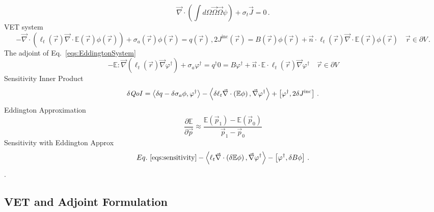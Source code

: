 \documentclass[review]{elsarticle}
\newcommand{\vr}{\vec{r}}
\newcommand{\vp}{\vec{p}}
\newcommand{\vO}{\vec{\Omega}}
\newcommand{\bra}{\left\langle}
\newcommand{\ket}{\right\rangle}
\newcommand{\sbra}{\left[}
\newcommand{\sket}{\right]}
\renewcommand{\div}{\vec{\nabla} \cdot}
\newcommand{\grad}{\vec{\nabla}}
\newcommand{\vefadj}{\varphi^\dag}
\newcommand{\bound}{\partial V}
\newcommand{\vn}{\vec{n}}
\newcommand{\Edd}{\mathbb{E}}
\newcommand{\BEdd}{B}
\newcommand{\sigt}{\sigma_t}
\newcommand{\siga}{\sigma_a}
\newcommand{\isigt}{\ell_t}
\newcommand{\scalSource}{q}
\newcommand{\scalResp}{q^\dag}
\newcommand{\qoi}{{\it QoI}\xspace}
\begin{document}
{\begin{subequations}
\begin{equation}
\label{1am}
\div \left(  \int d\Omega \vO \vO \psi \right) + \sigt \vec{J} = 0 \,.
\end{equation}
%
\end{subequations}
VET system
\begin{subequations} \label{eqs:EddingtonSystem}
\begin{equation} \label{eq:EddingtonVol}
- \div \left( \isigt(\vr)\div \Edd(\vr) \phi(\vr) \right) + \siga(\vr) \phi(\vr) = \scalSource(\vr) \,,
\end{equation}
\begin{equation} \label{eq:EddingtonBC}
2 J^{\text{inc}}(\vr) = \BEdd(\vr) \phi(\vr) + \vn \cdot \isigt(\vr) \div \Edd(\vr) \phi(\vr)  \quad \vr \in \bound \,.
\end{equation}
\end{subequations}
The adjoint of Eq.~\eqref{eqs:EddingtonSystem}
\begin{subequations}\label{eqs:EddingtonAdjSystem}
\begin{equation}\label{eq:EddingtonAdjVol}
- \Edd : \grad \left( \isigt(\vr)\grad \vefadj \right)  + \siga \vefadj = \scalResp
\end{equation}
\begin{equation}\label{eq:EddingtonAdjBC}
0 = B \vefadj+ \vn \cdot
\Edd \cdot \isigt(\vr) \vec{\nabla} \vefadj    \quad \vr \in \bound
\end{equation}
\end{subequations}
Sensitivity Inner Product
\begin{equation}\label{eqs:sensitivity}
\delta \qoi =  \bra \delta \scalSource - \delta \siga \phi, \vefadj \ket  - \bra \delta \isigt \div \left( \Edd \phi \right) , \grad \vefadj \ket
 + \sbra \vefadj, 2 \delta J^{\text{inc}} \sket \,.
\end{equation}
Eddington Approximation
\begin{equation}
\label{Eddapprox}
\frac{\partial \Edd}{\partial \vp} \approx \frac{\Edd(\vp_1) - \Edd(\vp_0)}{\vp_1 - \vp_0}
\end{equation}
Sensitivity with Eddington Approx
\begin{equation}
\label{EddErr}
 Eq.~\eqref{eqs:sensitivity}- \bra  \isigt \div \left( \delta \Edd \phi \right), \grad \vefadj \ket
- \sbra \vefadj, \delta \BEdd \phi \sket \,.
\end{equation} 
.}

\subsection{VET and Adjoint Formulation}
\end{document}
